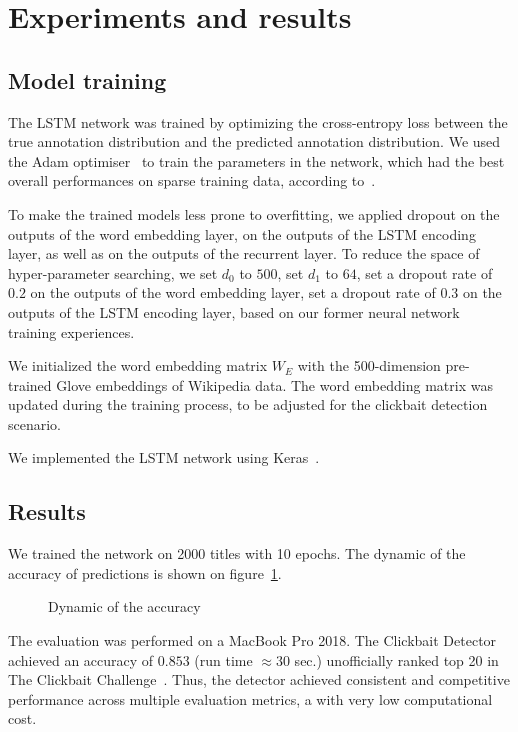 \section{Experiments and results}
\subsection{Model training}
The LSTM network was trained by optimizing the cross-entropy loss between the true annotation distribution and the predicted annotation distribution. We used the Adam optimiser~\cite{Kingma2014} to train the parameters in the network, which had the best overall performances on sparse training data, according to~\cite{Ruder2016}. 

To make the trained models less prone to overfitting, we applied dropout on the outputs of the word embedding layer, on the outputs of the LSTM encoding layer, as well as on the outputs of the recurrent layer. To reduce the space of hyper-parameter searching, we set $d_0$ to $500$, set $d_1$ to $64$, set a dropout rate of $0.2$ on the outputs of the word embedding layer, set a dropout rate of 0.3
on the outputs of the LSTM encoding layer, based on our former
neural network training experiences.

We initialized the word embedding matrix $W_E$ with the 500-dimension pre-trained Glove embeddings of Wikipedia data. The word embedding matrix was updated during the training process, to be adjusted for the clickbait detection scenario.

We implemented the LSTM network using Keras~\cite{Keras}.

\subsection{Results}
We trained the network on 2000 titles with 10 epochs. The dynamic of the accuracy of predictions is shown on figure~\ref{fig:results_training}. 

\begin{figure}[H]
    \centering
  \caption{Dynamic of the accuracy}
  \label{fig:results_training}
\end{figure}

The evaluation was performed on a MacBook Pro 2018. The Clickbait Detector achieved  an accuracy of $0.853$ (run time $\approx 30$ sec.) unofficially ranked top 20 in The Clickbait Challenge~\cite{Clickbait2016}. Thus, the detector achieved consistent and competitive performance across multiple evaluation metrics, a with very low computational cost.
